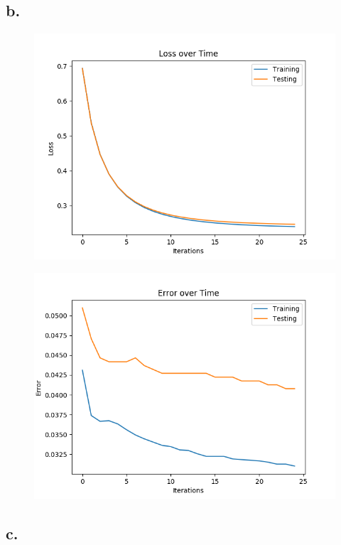 \documentclass{article}
\newcommand{\1}{\mathbf{1}}
\begin{document}
{\newpage

\subsection*{b.}

\begin{figure}[hb]
  \centering
  \includegraphics[width=120mm]{../hw2-code/results/a6_bi.png}
\end{figure}

\begin{figure}[h]
  \centering
  \includegraphics[width=120mm]{../hw2-code/results/a6_bii.png}
\end{figure}

\newpage

\subsection*{c.}

}
\end{document}
